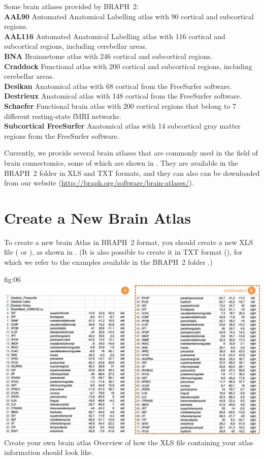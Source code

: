 \documentclass[justified]{tufte-handout}
\begin{document}
	{
	Some brain atlases provided by BRAPH~2: \\
	{\bf AAL90} Automated Anatomical Labelling atlas with 90 cortical and subcortical regions.\\
	{\bf AAL116} Automated Anatomical Labelling atlas with 116 cortical and subcortical regions, including cerebellar areas.\\
	{\bf BNA} Brainnetome atlas with 246 cortical and subcortical regions.\\
	{\bf Craddock} Functional atlas with 200 cortical and subcortical regions, including cerebellar areas.\\
	{\bf Desikan} Anatomical atlas with 68 cortical from the FreeSurfer software.\\
	{\bf Destrieux} Anatomical atlas with 148 cortical from the FreeSurfer software.\\
	{\bf Schaefer} Functional brain atlas with 200 cortical regions that belong to 7 different resting-state fMRI networks.\\
	{\bf Subcortical FreeSurfer} Anatomical atlas with 14 subcortical gray matter regions from the FreeSurfer software.
	}

Currently, we provide several brain atlases that are commonly used in the field of brain connectomics, some of which are shown in . 
They are available in the BRAPH~2 folder  in XLS and TXT formats, and they can also can be downloaded from our website (\url{http://braph.org/software/brain-atlases/}).


\clearpage
\section{Create a New Brain Atlas}

To create a new brain Atlas in BRAPH~2 format, you should create a new XLS file ( or ), as shown in . 
(It is also possible to create it in TXT format (), for which we refer to the examples available in the BRAPH~2 folder .)

	{fig:06}
	{\includegraphics{fig06.jpg}}
	{Create your own brain atlas}
	{
	Overview of how the XLS file containing your atlas information should look like.
	}
\end{document}
